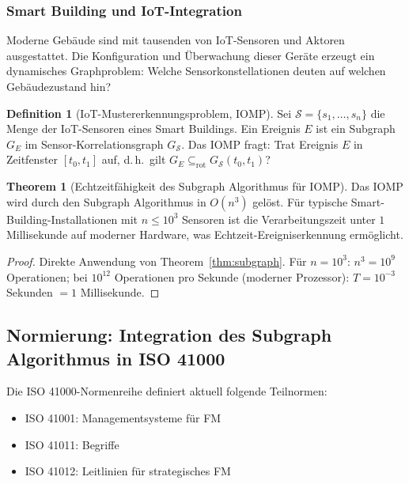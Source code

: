﻿\documentclass[a4paper,12pt]{article}
\theoremstyle{definition}
\newtheorem{definition}{Definition}[section]
\newtheorem{theorem}{Theorem}[section]
\begin{document}
\subsubsection{Smart Building und IoT-Integration}

Moderne Gebäude sind mit tausenden von IoT-Sensoren und Aktoren ausgestattet.
Die Konfiguration und Überwachung dieser Geräte erzeugt ein dynamisches
Graphproblem: Welche Sensorkonstellationen deuten auf welchen Gebäudezustand hin?

\begin{definition}[IoT-Mustererkennungsproblem, IOMP]
\label{def:iomp}
Sei $\mathcal{S} = \{s_1, \ldots, s_n\}$ die Menge der IoT-Sensoren eines
Smart Buildings. Ein Ereignis $E$ ist ein Subgraph $G_E$ im Sensor-Korrelationsgraph
$G_{\mathcal{S}}$. Das IOMP fragt: Trat Ereignis $E$ in Zeitfenster $[t_0, t_1]$ auf,
d.\,h.\ gilt $G_E \subseteq_{\mathrm{rot}} G_{\mathcal{S}}(t_0, t_1)$?
\end{definition}

\begin{theorem}[Echtzeitfähigkeit des Subgraph Algorithmus für IOMP]
\label{thm:iomp}
Das IOMP wird durch den Subgraph Algorithmus in $O(n^3)$ gelöst.
Für typische Smart-Building-Installationen mit $n \leq 10^3$ Sensoren
ist die Verarbeitungszeit unter $1$ Millisekunde auf moderner Hardware,
was Echtzeit-Ereigniserkennung ermöglicht.
\end{theorem}

\begin{proof}
Direkte Anwendung von Theorem~\ref{thm:subgraph}. Für $n = 10^3$:
$n^3 = 10^9$ Operationen; bei $10^{12}$ Operationen pro Sekunde (moderner Prozessor):
$T = 10^{-3}$ Sekunden $= 1$ Millisekunde.
\end{proof}

\subsection{Normierung: Integration des Subgraph Algorithmus in ISO 41000}

Die ISO 41000-Normenreihe definiert aktuell folgende Teilnormen:
\begin{itemize}
    \item ISO 41001: Managementsysteme für FM
    \item ISO 41011: Begriffe
    \item ISO 41012: Leitlinien für strategisches FM
\end{itemize}
\end{document}
